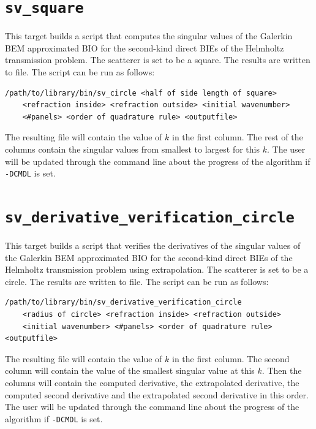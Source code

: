 \documentclass[a4paper, oneside]{discothesis}
\begin{document}
\cprotect\section{\verb|sv_square|}
This target builds a script that computes the singular values
of the Galerkin BEM approximated BIO for the
second-kind direct BIEs of the Helmholtz
transmission problem.
The scatterer is set to be a square.
The results are written to file.
The script can be run as follows:
\begin{verbatim}
/path/to/library/bin/sv_circle <half of side length of square> 
	<refraction inside> <refraction outside> <initial wavenumber>
	<#panels> <order of quadrature rule> <outputfile>
\end{verbatim}
The resulting file will contain the value of $k$ in the first column.
The rest of the columns contain the singular values from smallest to largest for this $k$.
The user will be updated through the command line about the progress of the algorithm if \verb|-DCMDL| is set.


\cprotect\section{\verb|sv_derivative_verification_circle|}
This target builds a script that verifies the derivatives of the singular
values of the Galerkin BEM approximated BIO for the
second-kind direct BIEs of the Helmholtz transmission problem
using extrapolation.
The scatterer is set to be a circle.
The results are written to file.
The script can be run as follows:
\begin{verbatim}
/path/to/library/bin/sv_derivative_verification_circle 
	<radius of circle> <refraction inside> <refraction outside> 
	<initial wavenumber> <#panels> <order of quadrature rule> <outputfile>
\end{verbatim}
The resulting file will contain the value of $k$ in the first column.
The second column will contain the value of the smallest singular value at this $k$.
Then the columns will contain the computed derivative, the extrapolated derivative, the computed second derivative and the extrapolated second derivative in this order.
The user will be updated through the command line about the progress of the algorithm if \verb|-DCMDL| is set.
\end{document}
